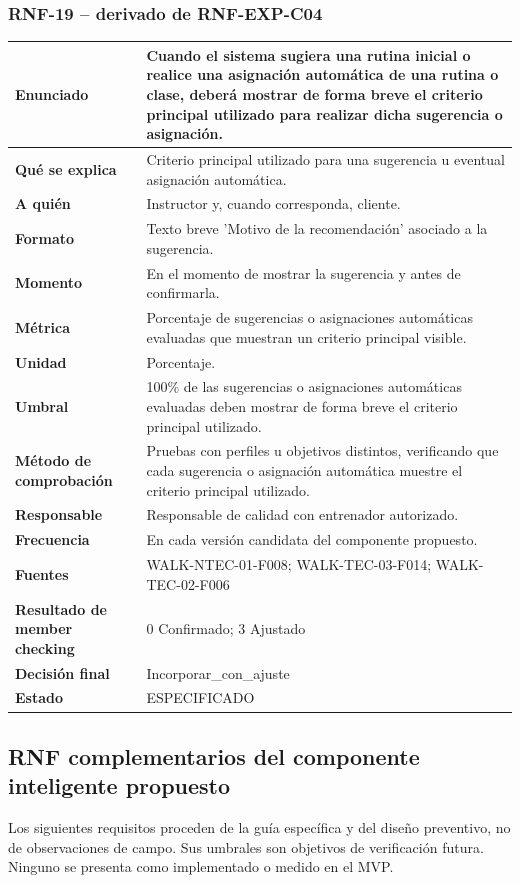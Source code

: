 \documentclass[11pt,a4paper,twoside]{article}
\begin{document}
\subsubsection{RNF-19 -- derivado de RNF-EXP-C04}
\begin{tabularx}{\textwidth}{|>{\bfseries}p{4.0cm}|X|}\hline
Enunciado & Cuando el sistema sugiera una rutina inicial o realice una asignación automática de una rutina o clase, deberá mostrar de forma breve el criterio principal utilizado para realizar dicha sugerencia o asignación. \\ \hline
Qué se explica & Criterio principal utilizado para una sugerencia u eventual asignación automática. \\ \hline
A quién & Instructor y, cuando corresponda, cliente. \\ \hline
Formato & Texto breve 'Motivo de la recomendación' asociado a la sugerencia. \\ \hline
Momento & En el momento de mostrar la sugerencia y antes de confirmarla. \\ \hline
Métrica & Porcentaje de sugerencias o asignaciones automáticas evaluadas que muestran un criterio principal visible. \\ \hline
Unidad & Porcentaje. \\ \hline
Umbral & 100\% de las sugerencias o asignaciones automáticas evaluadas deben mostrar de forma breve el criterio principal utilizado. \\ \hline
Método de comprobación & Pruebas con perfiles u objetivos distintos, verificando que cada sugerencia o asignación automática muestre el criterio principal utilizado. \\ \hline
Responsable & Responsable de calidad con entrenador autorizado. \\ \hline
Frecuencia & En cada versión candidata del componente propuesto. \\ \hline
Fuentes & WALK-NTEC-01-F008; WALK-TEC-03-F014; WALK-TEC-02-F006 \\ \hline
Resultado de member checking & 0 Confirmado; 3 Ajustado \\ \hline
Decisión final & Incorporar\_con\_ajuste \\ \hline
Estado & ESPECIFICADO \\ \hline
\end{tabularx}


\subsection{RNF complementarios del componente inteligente propuesto}
Los siguientes requisitos proceden de la guía específica y del diseño preventivo, no de observaciones de campo. Sus umbrales son objetivos de verificación futura. Ninguno se presenta como implementado o medido en el MVP.
\end{document}
